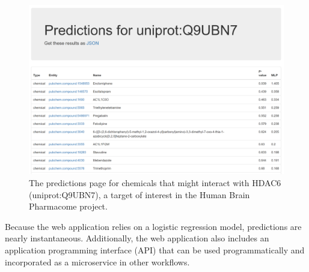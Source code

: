 \begin{figure}[h!]
    \centering
    \includegraphics[scale=0.5]
    {figures/protein_prediction.png}
    \caption[The predictions page for chemicals that might interact with HDAC6]{\label{fig:protein_prediction} The predictions page for chemicals that might interact with HDAC6 (uniprot:Q9UBN7), a target of interest in the Human Brain Pharmacome project\footnotemark .}
\end{figure}


Because the web application relies on a logistic regression model, predictions are nearly instantaneous.
Additionally, the web application also includes an application programming interface (API) that can be used programmatically and incorporated as a microservice in other workflows.
